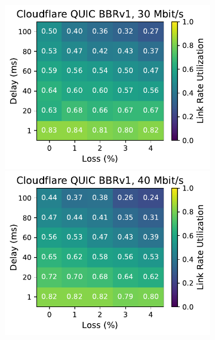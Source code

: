 \begin{figure}[ht]
\begin{subfigure}[b]{0.22\linewidth}
        \includegraphics[width=\linewidth,trim={0 0 2cm 0},clip]{splitting/figures/heatmaps/heatmap_quiche_bbr1_30mbps.pdf}
        \includegraphics[width=\linewidth,trim={0 0 2cm 0},clip]{splitting/figures/heatmaps/heatmap_quiche_bbr1_40mbps.pdf}

\end{subfigure}
\end{figure}
